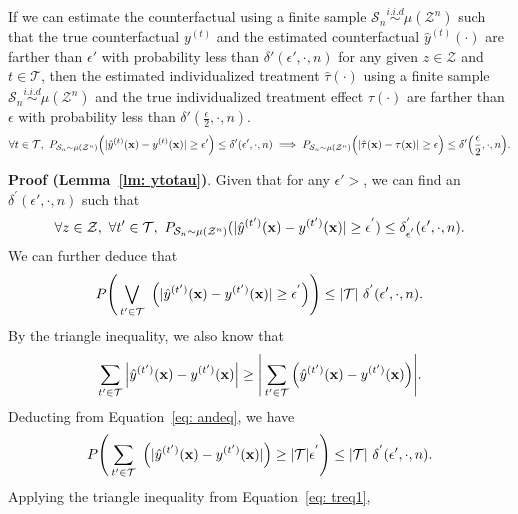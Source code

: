\begin{lemma}
\label{lm: ytotau}
If we can estimate the counterfactual %
using a finite sample $\mathcal{S}_n\overset{i.i.d}{\sim}\mu(\mathcal{Z}^n)$ such that the true counterfactual $y^{(t)}$ and the estimated counterfactual $\hat{y}^{(t)}(\cdot)$ are farther than $\epsilon'$ with probability less than $\delta'(\epsilon',\cdot,n)$ for any given $z\in\mathcal{Z}$ and $t \in \mathcal{T}$,
then the estimated individualized treatment $\hat{\tau}(\cdot)$ using a finite sample $\mathcal{S}_n\overset{i.i.d}{\sim}\mu(\mathcal{Z}^n)$ and the true individualized treatment effect $\tau(\cdot)$ are farther than $\epsilon$ with probability less than $\delta'(\frac{\epsilon}{2},\cdot,n)$.
$$ \forall t\in \mathcal{T}, ~P_{\mathcal{S}_n \sim \mu(\mathcal{Z}^n)}\Big( |\hat{y}^{(t)}(\mathbf{x}) - y^{(t)}(\mathbf{x})| \geq \epsilon' \Big) \leq \delta'(\epsilon',\cdot,n) \implies P_{\mathcal{S}_n \sim \mu(\mathcal{Z}^n)}\Big( |\hat{\tau}(\mathbf{x}) - \tau(\mathbf{x})| \geq \epsilon \Big) \leq \delta'\Big(\frac{\epsilon}{2},\cdot,n\Big). $$
\end{lemma}
\textbf{Proof (Lemma~\ref{lm: ytotau})}.
Given that for any $\epsilon'>$, we can find an $ \delta^{'}(\epsilon',\cdot,n)$ such that 
\begin{equation*}
    \forall z\in\mathcal{Z},~\forall t'\in \mathcal{T},~P_{\mathcal{S}_n \sim \mu(\mathcal{Z}^n)}(|\hat{y}^{(t')}(\mathbf{x}) - y^{(t')}(\mathbf{x})|\geq \epsilon^{'})\leq \delta^{'}_{\epsilon^{'}}(\epsilon',\cdot,n).
\end{equation*}
We can further deduce that
\begin{equation}
    \label{eq: andeq}
    P\Bigg( \bigvee_{t'\in\mathcal{T}}~\Big(|\hat{y}^{(t')}(\mathbf{x}) - y^{(t')}(\mathbf{x})| \geq \epsilon^{'}\Big) \Bigg) \leq |\mathcal{T}|~\delta^{'}(\epsilon',\cdot,n).
\end{equation}
By the triangle inequality, we also know that
\begin{equation}
\label{eq: treq1}
  \sum_{t'\in\mathcal{T}}\Big|\hat{y}^{(t')}(\mathbf{x}) - y^{(t')}(\mathbf{x})\Big|
    \geq \Bigg| \sum_{t'\in\mathcal{T}}\Big(\hat{y}^{(t')}(\mathbf{x}) - y^{(t')}(\mathbf{x})\Big) \Bigg|.
\end{equation}
Deducting from Equation~\ref{eq: andeq}, we have
\begin{equation*}
    P\Bigg( \sum_{t'\in\mathcal{T}}~\Big(|\hat{y}^{(t')}(\mathbf{x}) - y^{(t')}(\mathbf{x})|\Big)  \geq |\mathcal{T}|\epsilon^{'}\Bigg) \leq |\mathcal{T}|~\delta^{'}(\epsilon',\cdot,n).
\end{equation*}
Applying the triangle inequality from Equation~\ref{eq: treq1},
